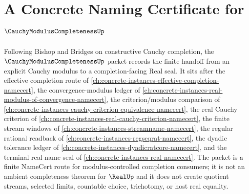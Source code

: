 \chapter{A Concrete Naming Certificate for $\CauchyModulusCompletenessUp$}
\label{ch:concrete-instances-cauchy-modulus-completeness-namecert}

Following Bishop and Bridges on constructive Cauchy completion, the $\CauchyModulusCompletenessUp$ packet records the finite handoff from an explicit Cauchy modulus to a completion-facing Real seal. It sits after the effective completion route of \autoref{ch:concrete-instances-effective-completion-namecert}, the convergence-modulus ledger of \autoref{ch:concrete-instances-real-modulus-of-convergence-namecert}, the criterion/modulus comparison of \autoref{ch:concrete-instances-cauchy-criterion-equivalence-namecert}, the real Cauchy criterion of \autoref{ch:concrete-instances-real-cauchy-criterion-namecert}, the finite stream windows of \autoref{ch:concrete-instances-streamname-namecert}, the regular rational readback of \autoref{ch:concrete-instances-regseqrat-namecert}, the dyadic tolerance ledger of \autoref{ch:concrete-instances-dyadicratcore-namecert}, and the terminal real-name seal of \autoref{ch:concrete-instances-real-namecert}. The packet is a finite NameCert route for modulus-controlled completion consumers; it is not an ambient completeness theorem for $\RealUp$ and it does not create quotient streams, selected limits, countable choice, trichotomy, or host real equality.

